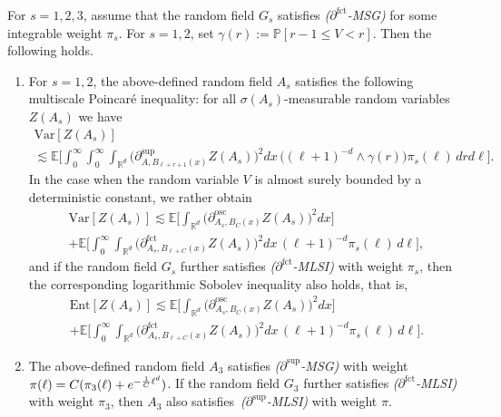 \documentclass[AHL,Unicode,longabstracts]{cedram}
\newcommand{\R}{\mathbb R}
\newcommand{\expecM}[1]{\mathbb{E}\bigg[#1 \bigg]}
\newcommand{\pr}[1]{\mathbb{P}\left[#1 \right]}
\newcommand{\parfct}[1]{\partial_{#1}^{\operatorname{fct}}}
\newcommand{\parsup}[1]{\partial_{#1}^{\operatorname{\sup}}}
\newcommand{\osc}{\partial^{\mathrm{osc}}}
\newcommand{\oscd}[1]{\mathrel{\osc_{#1}}}
\newcommand{\var}[1]{\mathrm{Var}\left[#1\right]}
\newcommand{\ent}[1]{\mathrm{Ent}\!\left[#1\right]}
\newcommand*{\romanenumi}{\renewcommand*{\theenumi}{\roman{enumi}}}
\begin{document}
\begin{prop}\label{prop:ex-dep-color}
For $s=1,2,3$, assume that the random field $G_s$ satisfies \emph{($\parfct{}$-MSG)} for some integrable weight $\pi_s$. For $s=1,2$, set $\gamma(r):=\pr{r-1\le V<r}$. Then the following holds.
\begin{enumerate}\romanenumi
\item \label{prop3.8.1}For $s=1,2$, the above-defined random field $A_s$ satisfies the following multiscale Poincaré inequality: for all $\sigma(A_s)$-measurable random variables $Z(A_s)$ we have
\begin{multline}\label{eq:s1-gen}
\var{Z(A_s)}\\
\lesssim
\expecM{\int_0^\infty\int_{0}^\infty\int_{\R^d}\Big(\parsup{A,B_{\ell+r+1}(x)}Z(A_s)\Big)^2dx\,\big((\ell+1)^{-d}\wedge\gamma(r)\big)\pi_s(\ell)\,drd\ell}.
\end{multline}
In the case when the random variable $V$ is almost surely bounded by a deterministic constant, we rather obtain
\begin{multline}\label{eq:s1-bound}
\var{Z(A_s)}\lesssim\expecM{\int_{\R^d}\Big(\oscd{A_s,B_{C}(x)}Z(A_s)\Big)^2dx}\\
+\expecM{\int_0^\infty\int_{\R^d}\Big(\parfct{A_s,B_{\ell+C}(x)}Z(A_s)\Big)^2dx\,(\ell+1)^{-d}\pi_s(\ell)\,d\ell},
\end{multline}
and if the random field $G_s$ further satisfies \emph{($\parfct{}$-MLSI)} with weight $\pi_s$, then the corresponding logarithmic Sobolev inequality also holds, that is,
\begin{multline*}
\ent{Z(A_s)}\lesssim\expecM{\int_{\R^d}\Big(\oscd{A_s,B_{C}(x)}Z(A_s)\Big)^2dx}\\
+\expecM{\int_0^\infty\int_{\R^d}\Big(\parfct{A_s,B_{\ell+C}(x)}Z(A_s)\Big)^2dx\,(\ell+1)^{-d}\pi_s(\ell)\,d\ell}.
\end{multline*}
\item \label{prop3.8.2}The above-defined random field $A_3$ satisfies \emph{($\parsup{}$-MSG)} with weight $\pi(\ell)\linebreak=C(\pi_3(\ell)+e^{-\frac1C\ell^d})$. If the random field $G_3$ further satisfies \emph{($\parfct{}$-MLSI)} with weight $\pi_3$, then $A_3$ also satisfies~\emph{($\parsup{}$-MLSI)} with weight $\pi$.
\qedhere
\end{enumerate}
\end{prop}
\end{document}
